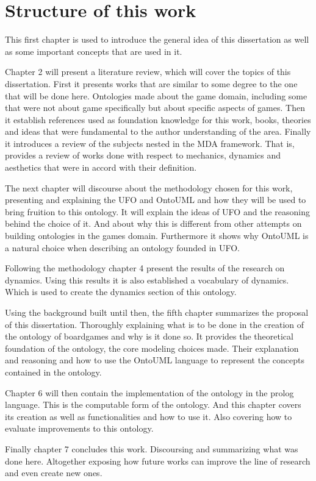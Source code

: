 \section{Structure of this work}

This first chapter is used to introduce the general idea of this dissertation as well as some important concepts that are used in it.

Chapter 2 will present a literature review, which will cover the topics of this dissertation. First it presents works that are similar to some degree to the one that will be done here. Ontologies made about the game domain, including some that were not about game specifically but about specific aspects of games. Then it establish references used as foundation knowledge for this work, books, theories and ideas that were fundamental to the author understanding of the area. Finally it introduces a review of the subjects nested in the MDA framework. That is, provides a review of works done with respect to mechanics, dynamics and aesthetics that were in accord with their definition.

The next chapter will discourse about the methodology chosen for this work, presenting and explaining the UFO and OntoUML and how they will be used to bring fruition to this ontology. It will explain the ideas of UFO and the reasoning behind the choice of it. And about why this is different from other attempts on building ontologies in the games domain. Furthermore it shows why OntoUML is a natural choice when describing an ontology founded in UFO. 

Following the methodology chapter 4 present the results of the research on dynamics. Using this results it is also established a vocabulary of dynamics. Which is used to create the dynamics section of this ontology.

Using the background built until then, the fifth chapter summarizes the proposal of this dissertation. Thoroughly explaining what is to be done in the creation of the ontology of boardgames and why is it done so. It provides the theoretical foundation of the ontology, the core modeling choices made. Their explanation and reasoning and how to use the OntoUML language to represent the concepts contained in the ontology.

Chapter 6 will then contain the implementation of the ontology in the prolog language. This is the computable form of the ontology. And this chapter covers its creation as well as functionalities and how to use it. Also covering how to evaluate improvements to this ontology.

Finally chapter 7 concludes this work. Discoursing and summarizing what was done here. Altogether exposing how future works can improve the line of research and even create new ones.

